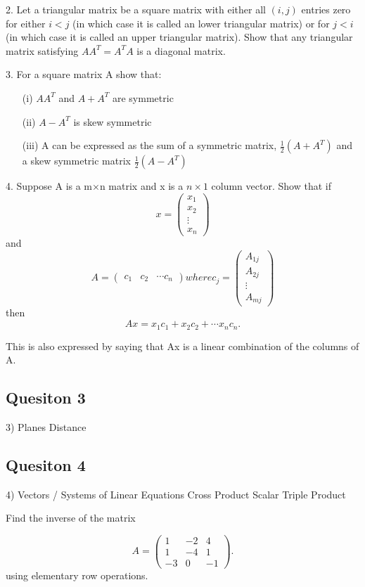 \documentclass[12pt,a4paper]{article}
\begin{document}
2. Let a triangular matrix be a square matrix with either all $(i,j)$ entries zero for either $i<j$ 
(in which case it is called an lower triangular matrix) or for $j<i$ (in which case it is called an upper triangular matrix). 
Show that any triangular matrix satisfying $AA^T = A^TA$ is a diagonal matrix.

3. For a square matrix A show that:

\begin{itemize}
\item[(i)] $AA^T$ and $A+A^T$ are symmetric
\item[(ii)] $A-A^T$ is skew symmetric
\item[(iii)] A can be expressed as the sum of a symmetric matrix, $\frac{1}{2}(A+A^T)$ and a skew 
symmetric matrix $\frac{1}{2}(A-A^T)$
\end{itemize}

4. Suppose A is a m×n matrix and x is a $n \times 1$ column vector. Show that if 
\[x=\begin{pmatrix}x_1\\x_2\\\vdots\\x_n\end{pmatrix}\] and 
\[A=\begin{pmatrix}c_1 & c_2 &\cdots c_n \end{pmatrix} where c_j=\begin{pmatrix}A_{1j}\\A_{2j}\\\vdots\\A_{mj}\end{pmatrix}\]
 then \[Ax = x_1c_1+x_2c_2+\cdots x_nc_n. \]

This is also expressed by saying that Ax is a linear combination of the columns of A.
\subsection*{Quesiton 3}

3) Planes
	Distance
\subsection*{Quesiton 4}
4) Vectors / Systems of Linear Equations
	Cross Product
	Scalar Triple Product


 Find the inverse of the  matrix 

\begin{equation*}
A=\left( \begin{array}{rrr}
1 & -2 & 4\\
1 & -4 & 1\\
-3 & 0 & -1
\end{array} \right).
\end{equation*}
using elementary row operations.
\end{document}
